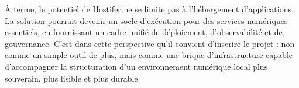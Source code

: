 À terme, le potentiel de Hostifer ne se limite pas à l'hébergement d'applications. La solution pourrait devenir un socle d'exécution pour des services numériques essentiels, en fournissant un cadre unifié de déploiement, d'observabilité et de gouvernance. C'est dans cette perspective qu'il convient d'inscrire le projet : non comme un simple outil de plus, mais comme une brique d'infrastructure capable d'accompagner la structuration d'un environnement numérique local plus souverain, plus lisible et plus durable.